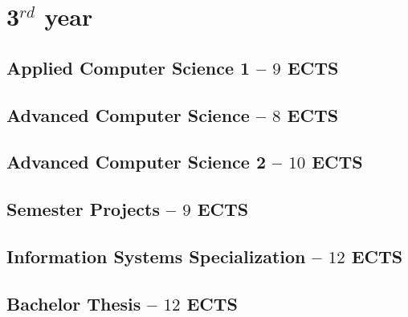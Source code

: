 \documentclass[11pt]{article}
\newcommand{\module}[2]{
    \subsection{#1 \small -- $#2$ ECTS}
}
\begin{document}
%
%
\section{3$^{rd}$ year}
\module{Applied Computer Science 1}{9}
\pagebreak

\module{Advanced Computer Science}{8}
\pagebreak
\module{Advanced Computer Science 2}{10}
\pagebreak
\pagebreak

\module{Semester Projects}{9}
\module{Information Systems Specialization}{12}
\pagebreak
\module{Bachelor Thesis}{12}
\end{document}
